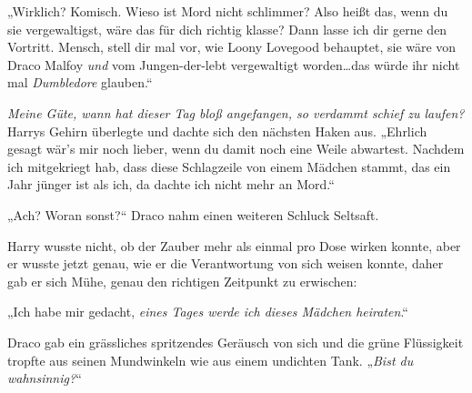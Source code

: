 „Wirklich? Komisch. Wieso ist Mord nicht schlimmer? Also heißt das, wenn du sie vergewaltigst, wäre das für dich richtig klasse? Dann lasse ich dir gerne den Vortritt. Mensch, stell dir mal vor, wie Loony Lovegood behauptet, sie wäre von Draco Malfoy \emph{und} vom Jungen-der-lebt vergewaltigt worden…das würde ihr nicht mal \emph{Dumbledore} glauben.“


\emph{Meine Güte, wann hat dieser Tag bloß angefangen, so verdammt schief zu laufen?} Harrys Gehirn überlegte und dachte sich den nächsten Haken aus. „Ehrlich gesagt wär's mir noch lieber, wenn du damit noch eine Weile abwartest. Nachdem ich mitgekriegt hab, dass diese Schlagzeile von einem Mädchen stammt, das ein Jahr jünger ist als ich, da dachte ich nicht mehr an Mord.“

„Ach? Woran sonst?“ Draco nahm einen weiteren Schluck Seltsaft.

Harry wusste nicht, ob der Zauber mehr als einmal pro Dose wirken konnte, aber er wusste jetzt genau, wie er die Verantwortung von sich weisen konnte, daher gab er sich Mühe, genau den richtigen Zeitpunkt zu erwischen:

„Ich habe mir gedacht, \emph{eines Tages werde ich dieses Mädchen heiraten}.“

Draco gab ein grässliches spritzendes Geräusch von sich und die grüne Flüssigkeit tropfte aus seinen Mundwinkeln wie aus einem undichten Tank. „\emph{Bist du wahnsinnig?}“

